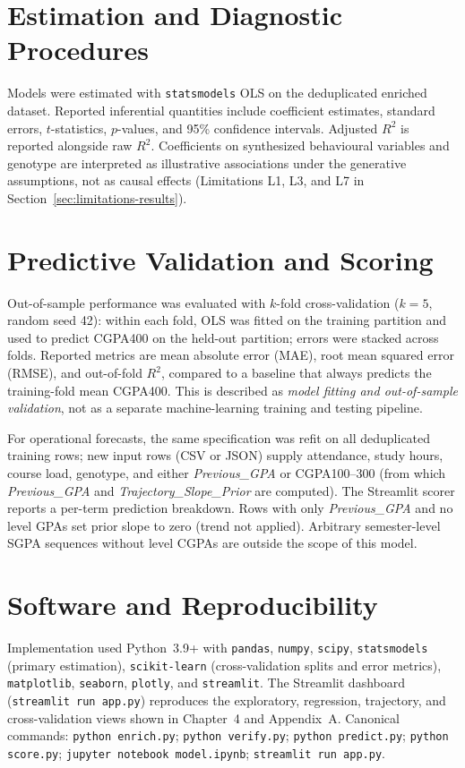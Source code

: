\documentclass[12pt]{report}
\begin{document}
	\section{Estimation and Diagnostic Procedures}
	Models were estimated with \texttt{statsmodels} OLS on the deduplicated enriched dataset. Reported inferential quantities include coefficient estimates, standard errors, $t$-statistics, $p$-values, and 95\% confidence intervals. Adjusted $R^2$ is reported alongside raw $R^2$. Coefficients on synthesized behavioural variables and genotype are interpreted as illustrative associations under the generative assumptions, not as causal effects (Limitations L1, L3, and L7 in Section~\ref{sec:limitations-results}).
	
	\section{Predictive Validation and Scoring}
	Out-of-sample performance was evaluated with $k$-fold cross-validation ($k = 5$, random seed 42): within each fold, OLS was fitted on the training partition and used to predict CGPA400 on the held-out partition; errors were stacked across folds. Reported metrics are mean absolute error (MAE), root mean squared error (RMSE), and out-of-fold $R^2$, compared to a baseline that always predicts the training-fold mean CGPA400. This is described as \textit{model fitting and out-of-sample validation}, not as a separate machine-learning training and testing pipeline.
	
	For operational forecasts, the same specification was refit on all deduplicated training rows; new input rows (CSV or JSON) supply attendance, study hours, course load, genotype, and either \textit{Previous\_GPA} or CGPA100--300 (from which \textit{Previous\_GPA} and \textit{Trajectory\_Slope\_Prior} are computed). The Streamlit scorer reports a per-term prediction breakdown. Rows with only \textit{Previous\_GPA} and no level GPAs set prior slope to zero (trend not applied). Arbitrary semester-level SGPA sequences without level CGPAs are outside the scope of this model.
	
	\section{Software and Reproducibility}
	Implementation used Python~3.9+ with \texttt{pandas}, \texttt{numpy}, \texttt{scipy}, \texttt{statsmodels} (primary estimation), \texttt{scikit-learn} (cross-validation splits and error metrics), \texttt{matplotlib}, \texttt{seaborn}, \texttt{plotly}, and \texttt{streamlit}. The Streamlit dashboard (\texttt{streamlit run app.py}) reproduces the exploratory, regression, trajectory, and cross-validation views shown in Chapter~4 and Appendix~A. Canonical commands: \texttt{python enrich.py}; \texttt{python verify.py}; \texttt{python predict.py}; \texttt{python score.py}; \texttt{jupyter notebook model.ipynb}; \texttt{streamlit run app.py}.
	
\end{document}
